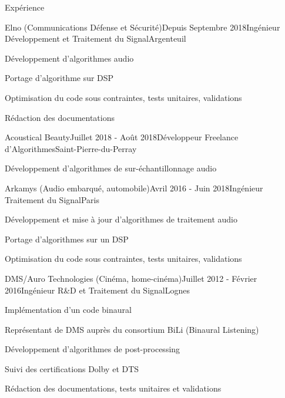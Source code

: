 \documentclass{resume} %
\begin{document}
	
\begin{rSection}{Expérience}

\begin{rSubsection}{Elno (Communications Défense et Sécurité)}{Depuis Septembre 2018}{Ingénieur Développement et Traitement du Signal}{Argenteuil}
\item Développement d'algorithmes audio
\item Portage d'algorithme sur DSP
\item Optimisation du code sous contraintes, tests unitaires, validations
\item Rédaction des documentations
\end{rSubsection}


\begin{rSubsection}{Acoustical Beauty}{Juillet 2018 - Août 2018}{Développeur Freelance d'Algorithmes}{Saint-Pierre-du-Perray}
\item Développement d'algorithmes de sur-échantillonnage audio
\end{rSubsection}


\begin{rSubsection}{Arkamys (Audio embarqué, automobile)}{Avril 2016 - Juin 2018}{Ingénieur Traitement du Signal}{Paris}
\item Développement et mise à jour d'algorithmes de traitement audio
\item Portage d'algorithmes sur un DSP
\item Optimisation du code sous contraintes, tests unitaires, validations
\end{rSubsection}


\begin{rSubsection}{DMS/Auro Technologies (Cinéma, home-cinéma)}{Juillet 2012 - Février 2016}{Ingénieur R\&D et Traitement du Signal}{Lognes}
\item Implémentation d'un code binaural
\item Représentant de DMS auprès du consortium BiLi (Binaural Listening)
\item Développement d'algorithmes de post-processing
\item Suivi des certifications Dolby et DTS
\item Rédaction des documentations, tests unitaires et validations
\end{rSubsection}


\end{rSection}
\end{document}

